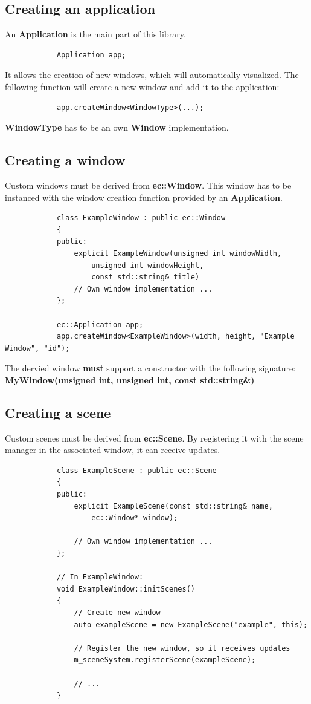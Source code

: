 \documentclass[12p, paper=a4, leqno, colorinlistoftodos]{article}
\begin{document}
		\subsection{Creating an application}
		An \textbf{Application} is the main part of this library.
		\begin{lstlisting}
			Application app;
		\end{lstlisting}
		It allows the creation of new windows, which will automatically visualized. The following function will create a new window and add it to the application:
		\begin{lstlisting}
			app.createWindow<WindowType>(...);
		\end{lstlisting}
		\textbf{WindowType} has to be an own \textbf{Window} implementation.
		
		\subsection{Creating a window}
		Custom windows must be derived from \textbf{ec::Window}. This window has to be instanced with the window creation function provided by an \textbf{Application}. 	
		\begin{lstlisting}
			class ExampleWindow : public ec::Window
			{
			public:
				explicit ExampleWindow(unsigned int windowWidth,
					unsigned int windowHeight,
					const std::string& title)
				// Own window implementation ...
			};
		
			ec::Application app;
			app.createWindow<ExampleWindow>(width, height, "Example Window", "id");
		\end{lstlisting}
		
		The dervied window  \textbf{must} support a constructor with the following signature:\\
		\textbf{MyWindow(unsigned int, unsigned int, const std::string\&)}
		
		
		
		\subsection{Creating a scene}
		Custom scenes must be derived from \textbf{ec::Scene}. By registering it with the scene manager in the associated window, it can receive updates.	
		
		\begin{lstlisting}
			class ExampleScene : public ec::Scene
			{
			public:
				explicit ExampleScene(const std::string& name, 
					ec::Window* window);
			
				// Own window implementation ...
			};
			
			// In ExampleWindow:
			void ExampleWindow::initScenes()
			{
				// Create new window
				auto exampleScene = new ExampleScene("example", this);
				
				// Register the new window, so it receives updates
				m_sceneSystem.registerScene(exampleScene);
			
				// ...
			}
		\end{lstlisting}
		
\end{document}
